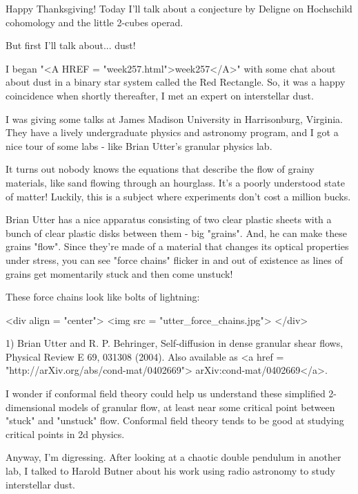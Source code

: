 




Happy Thanksgiving!  Today I'll talk about a conjecture by Deligne
on Hochschild cohomology and the little 2-cubes operad.  

But first I'll talk about... dust!

I began "<A HREF = "week257.html">week257</A>" with some
chat about about dust in a binary star system called the Red
Rectangle.  So, it was a happy coincidence when shortly thereafter, I
met an expert on interstellar dust.

I was giving some talks at James Madison University in Harrisonburg, 
Virginia.  They have a lively undergraduate physics and astronomy 
program, and I got a nice tour of some labs - like Brian Utter's 
granular physics lab.  

It turns out nobody knows the equations that describe the flow of 
grainy materials, like sand flowing through an hourglass.  It's a 
poorly understood state of matter!  Luckily, this is a subject where 
experiments don't cost a million bucks.  

Brian Utter has a nice apparatus consisting of two clear plastic
sheets with a bunch of clear plastic disks between them - big
"grains".  And, he can make these grains "flow".
Since they're made of a material that changes its optical properties
under stress, you can see "force chains" flicker in and out
of existence as lines of grains get momentarily stuck and then come
unstuck!

These force chains look like bolts of lightning:

<div align = "center">
<img src = "utter_force_chains.jpg">
</div>

1) Brian Utter and R. P. Behringer, Self-diffusion in dense
granular shear flows, Physical Review E 69, 031308 (2004).
Also available as <a href = "http://arXiv.org/abs/cond-mat/0402669">
arXiv:cond-mat/0402669</a>.

I wonder if conformal field theory could help us understand these 
simplified 2-dimensional models of granular flow, at least near some 
critical point between "stuck" and "unstuck" flow.  
Conformal field theory tends to be good at studying critical points in 2d 
physics.  

Anyway, I'm digressing.  After looking at a chaotic double pendulum 
in another lab, I talked to Harold Butner about his work using radio 
astronomy to study interstellar dust.  

